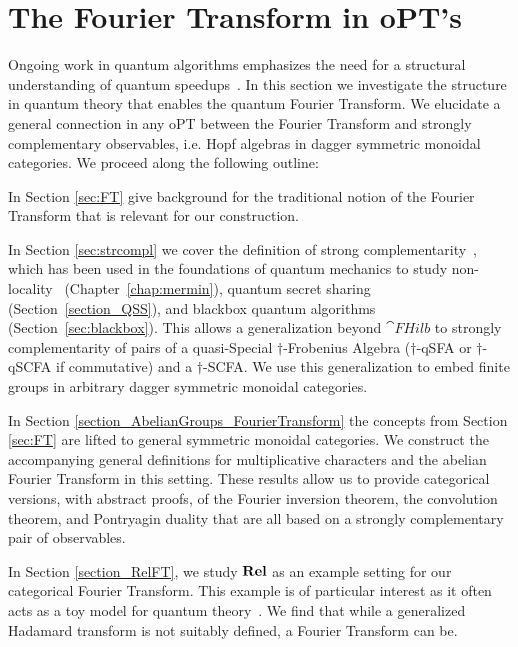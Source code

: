\section{The Fourier Transform in oPT's}
\label{sec:strcomplFT}

Ongoing work in quantum algorithms emphasizes the need for a structural understanding of quantum speedups~\cite{aaronson2014need}. In this section we investigate the structure in quantum theory that enables the quantum Fourier Transform. We elucidate a general connection in any oPT between the Fourier Transform and strongly complementary observables, i.e. Hopf algebras in dagger symmetric monoidal categories. We proceed along the following outline:

In Section \ref{sec:FT} give background for the traditional notion of the Fourier Transform that is relevant for our construction.  

In Section \ref{sec:strcompl} we cover the definition of strong complementarity~\cite{coecke2011interacting}, which has been used in the foundations of quantum mechanics to study non-locality~\cite{coecke2012strong, gogioso2015mermin} (Chapter~\ref{chap:mermin}), quantum secret sharing~\cite{gogioso2015mermin, zamdzhiev2012abstract} (Section~\ref{section_QSS}), and blackbox quantum algorithms~\cite{vicary-tqa, zeng2014abstract, zeng2015models} (Section~\ref{sec:blackbox}). This allows a generalization beyond $\cat{FHilb}$ to strongly complementarity of pairs of a quasi-Special $\dagger$-Frobenius Algebra ($\dagger$-qSFA or $\dagger$-qSCFA if commutative) and a $\dagger$-SCFA. We use this generalization to embed finite groups in arbitrary dagger symmetric monoidal categories.

In Section \ref{section_AbelianGroups_FourierTransform} the concepts from Section \ref{sec:FT} are lifted to general symmetric monoidal categories. We construct the accompanying general definitions for multiplicative characters and the abelian Fourier Transform in this setting.  These results allow us to provide categorical versions, with abstract proofs, of the Fourier inversion theorem, the convolution theorem, and Pontryagin duality that are all based on a strongly complementary pair of observables.

In Section \ref{section_RelFT}, we study $\mathbf{Rel}$ as an example setting for our categorical Fourier Transform. This example is of particular interest as it often acts as a toy model for quantum theory~\cite{evans2009classifying, cqm-notes, pavlovic2009quantum, zeng2015models}.  We find that while a generalized Hadamard transform is not suitably defined, a Fourier Transform can be.

